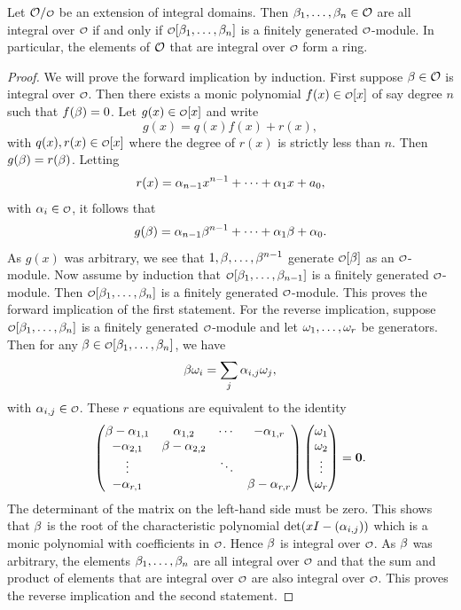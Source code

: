     \begin{proposition}\label{prop:integral_if_finitely_generated}
      Let \(\mc{O}/\smc{O}\) be an extension of integral domains. Then \(\beta_{1},\ldots,\beta_{n} \in \mathcal{O}\) are all integral over \(\smc{O}\) if and only if \(\smc{O}[\b_{1},\ldots,\b_{n}]\) is a finitely generated \(\smc{O}\)-module. In particular, the elements of \(\mathcal{O}\) that are integral over \(\smc{O}\) form a ring.
    \end{proposition}
    \begin{proof}
      We will prove the forward implication by induction. First suppose \(\beta \in \mathcal{O}\) is integral over \(\smc{O}\). Then there exists a monic polynomial \(f(x) \in \smc{O}[x]\) of say degree \(n\) such that \(f(\beta) = 0\). Let \(g(x) \in \smc{O}[x]\) and write
      \[
        g(x) = q(x)f(x)+r(x),
      \]
      with \(q(x),r(x) \in \smc{O}[x]\) where the degree of \(r(x)\) is strictly less than \(n\). Then \(g(\beta) = r(\beta)\). Letting
      \[
        r(x) = \alpha_{n-1}x^{n-1}+\cdots+\alpha_{1}x+a_{0},
      \]
      with \(\a_{i} \in \smc{O}\), it follows that
      \[
        g(\beta) = \alpha_{n-1}\beta^{n-1}+\cdots+\alpha_{1}\beta+\alpha_{0}.
      \]
      As \(g(x)\) was arbitrary, we see that \(1,\beta,\ldots,\beta^{n-1}\) generate \(\smc{O}[\b]\) as an \(\smc{O}\)-module. Now assume by induction that \(\smc{O}[\b_{1},\ldots,\b_{n-1}]\) is a finitely generated \(\smc{O}\)-module. Then \(\smc{O}[\b_{1},\ldots,\b_{n}]\) is a finitely generated \(\smc{O}\)-module. This proves the forward implication of the first statement. For the reverse implication, suppose \(\smc{O}[\b_{1},\ldots,\b_{n}]\) is a finitely generated \(\smc{O}\)-module and let \(\omega_{1},\ldots,\omega_{r}\) be generators. Then for any \(\b \in \smc{O}[\b_{1},\ldots,\b_{n}]\), we have
      \[
        \beta\omega_{i} = \sum_{j}\alpha_{i,j}\omega_{j},
      \]
      with \(\a_{i,j} \in \smc{O}\). These \(r\) equations are equivalent to the identity
      \[
        \begin{pmatrix} \beta-\alpha_{1,1} & \alpha_{1,2} & \cdots & -\alpha_{1,r} \\ -\alpha_{2,1} & \beta-\alpha_{2,2} & & \\ \vdots & & \ddots & \\ -\alpha_{r,1} & & & \beta-\alpha_{r,r} \end{pmatrix}\begin{pmatrix} \omega_{1} \\ \omega_{2} \\ \vdots \\ \omega_{r} \end{pmatrix} = \mathbf{0}.
      \]
      The determinant of the matrix on the left-hand side must be zero. This shows that \(\beta\) is the root of the characteristic polynomial \(\det(xI-(\alpha_{i,j}))\) which is a monic polynomial with coefficients in \(\smc{O}\). Hence \(\beta\) is integral over \(\smc{O}\). As \(\beta\) was arbitrary, the elements \(\beta_{1},\ldots,\beta_{n}\) are all integral over \(\smc{O}\) and that the sum and product of elements that are integral over \(\smc{O}\) are also integral over \(\smc{O}\). This proves the reverse implication and the second statement.
    \end{proof}

